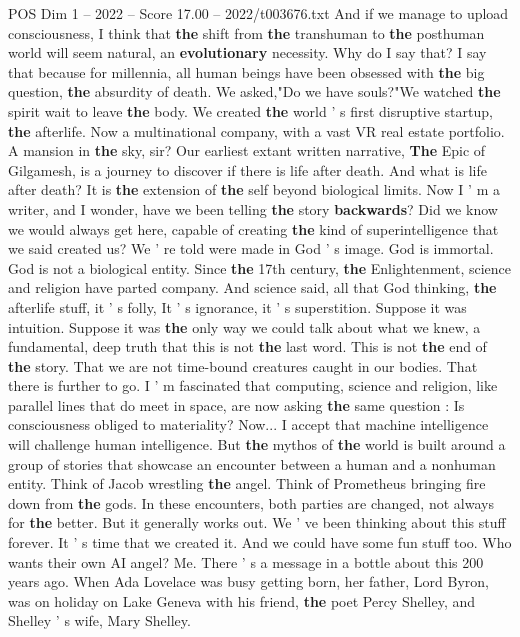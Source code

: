 \begin{textsample}{POS Dim 1 – 2022 – Score 17.00 – 2022/t003676.txt}
And if we manage to upload consciousness, I think that \textbf{the} shift from \textbf{the} transhuman to \textbf{the} posthuman world will seem natural, an \textbf{evolutionary} necessity.
Why do I say that?
I say that because for millennia, all human beings have been obsessed with \textbf{the} big question, \textbf{the} absurdity of death.
We asked,"Do we have souls?"We watched \textbf{the} spirit wait to leave \textbf{the} body.
We created \textbf{the} world ' s first disruptive startup, \textbf{the} afterlife.
Now a multinational company, with a vast VR real estate portfolio.
A mansion in \textbf{the} sky, sir?
Our earliest extant written narrative, \textbf{The} Epic of Gilgamesh, is a journey to discover if there is life after death.
And what is life after death?
It is \textbf{the} extension of \textbf{the} self beyond biological limits.
Now I ' m a writer, and I wonder, have we been telling \textbf{the} story \textbf{backwards}?
Did we know we would always get here, capable of creating \textbf{the} kind of superintelligence that we said created us?
We ' re told were made in God ' s image.
God is immortal.
God is not a biological entity.
Since \textbf{the} 17th century, \textbf{the} Enlightenment, science and religion have parted company.
And science said, all that God thinking, \textbf{the} afterlife stuff, it ' s folly, It ' s ignorance, it ' s superstition.
Suppose it was intuition.
Suppose it was \textbf{the} only way we could talk about what we knew, a fundamental, deep truth that this is not \textbf{the} last word.
This is not \textbf{the} end of \textbf{the} story.
That we are not time-bound creatures caught in our bodies.
That there is further to go.
I ' m fascinated that computing, science and religion, like parallel lines that do meet in space, are now asking \textbf{the} same question : Is consciousness obliged to materiality?
Now...
I accept that machine intelligence will challenge human intelligence.
But \textbf{the} mythos of \textbf{the} world is built around a group of stories that showcase an encounter between a human and a nonhuman entity.
Think of Jacob wrestling \textbf{the} angel.
Think of Prometheus bringing fire down from \textbf{the} gods.
In these encounters, both parties are changed, not always for \textbf{the} better.
But it generally works out.
We ' ve been thinking about this stuff forever.
It ' s time that we created it.
And we could have some fun stuff too.
Who wants their own AI angel?
Me.
There ' s a message in a bottle about this 200 years ago.
When Ada Lovelace was busy getting born, her father, Lord Byron, was on holiday on Lake Geneva with his friend, \textbf{the} poet Percy Shelley, and Shelley ' s wife, Mary Shelley.

\end{textsample}
